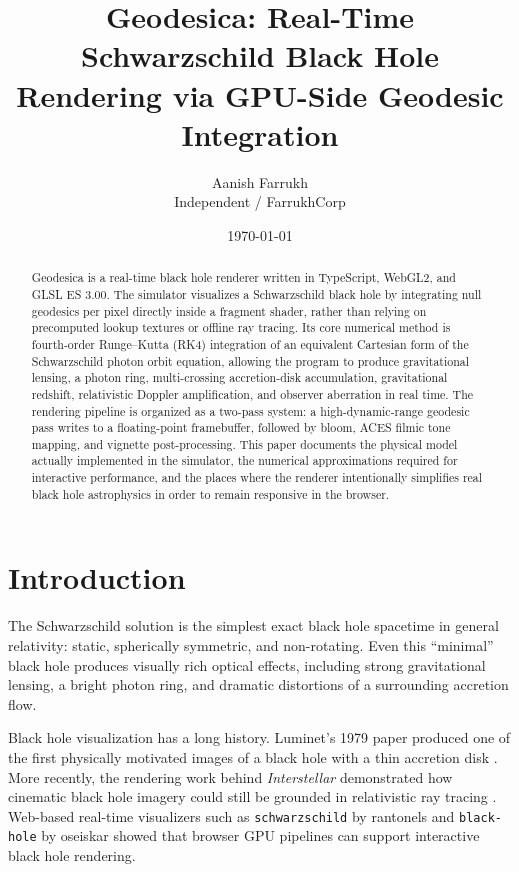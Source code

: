 \documentclass[12pt]{article}
\title{Geodesica: Real-Time Schwarzschild Black Hole Rendering via GPU-Side Geodesic Integration}
\author{Aanish Farrukh\\Independent / FarrukhCorp}
\date{\today}
\begin{document}
\maketitle

\begin{abstract}
Geodesica is a real-time black hole renderer written in TypeScript, WebGL2, and GLSL ES 3.00. The simulator visualizes a Schwarzschild black hole by integrating null geodesics per pixel directly inside a fragment shader, rather than relying on precomputed lookup textures or offline ray tracing. Its core numerical method is fourth-order Runge--Kutta (RK4) integration of an equivalent Cartesian form of the Schwarzschild photon orbit equation, allowing the program to produce gravitational lensing, a photon ring, multi-crossing accretion-disk accumulation, gravitational redshift, relativistic Doppler amplification, and observer aberration in real time. The rendering pipeline is organized as a two-pass system: a high-dynamic-range geodesic pass writes to a floating-point framebuffer, followed by bloom, ACES filmic tone mapping, and vignette post-processing. This paper documents the physical model actually implemented in the simulator, the numerical approximations required for interactive performance, and the places where the renderer intentionally simplifies real black hole astrophysics in order to remain responsive in the browser.
\end{abstract}

\section{Introduction}
The Schwarzschild solution is the simplest exact black hole spacetime in general relativity: static, spherically symmetric, and non-rotating. Even this ``minimal'' black hole produces visually rich optical effects, including strong gravitational lensing, a bright photon ring, and dramatic distortions of a surrounding accretion flow.

Black hole visualization has a long history. Luminet's 1979 paper produced one of the first physically motivated images of a black hole with a thin accretion disk \cite{luminet1979}. More recently, the rendering work behind \emph{Interstellar} demonstrated how cinematic black hole imagery could still be grounded in relativistic ray tracing \cite{james2015}. Web-based real-time visualizers such as \texttt{schwarzschild} by rantonels \cite{rantonels} and \texttt{black-hole} by oseiskar \cite{oseiskar} showed that browser GPU pipelines can support interactive black hole rendering.
\end{document}
